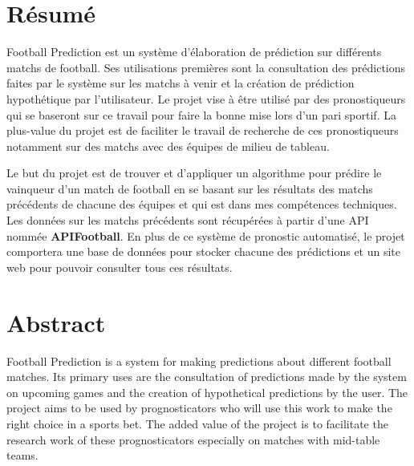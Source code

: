 \documentclass[a4paper,14pt]{extarticle}
\begin{document}
{\setlength{\parindent}{0cm} %
\setlength{\parskip}{1em} %

\newpage
\makeatletter

\begin{versionhistory}
\end{versionhistory}

\makeatother

\section{Résumé}

Football Prediction est un système d'élaboration de prédiction sur différents matchs de football. Ses utilisations premières sont la consultation des prédictions faites par le système sur les matchs à venir et la création de prédiction hypothétique par l'utilisateur. Le projet vise à être utilisé par des pronostiqueurs qui se baseront sur ce travail pour faire la bonne mise lors d'un pari sportif. La plus-value du projet est de faciliter le travail de recherche de ces pronostiqueurs notamment sur des matchs avec des équipes de milieu de tableau.

Le but du projet est de trouver et d'appliquer un algorithme pour prédire le vainqueur d'un match de football en se basant sur les résultats des matchs précédents de chacune des équipes et qui est dans mes compétences techniques. Les données sur les matchs précédents sont récupérées à partir d'une API nommée \textbf{APIFootball}. En plus de ce système de pronostic automatisé, le projet comportera une base de données pour stocker chacune des prédictions et un site web pour pouvoir consulter tous ces résultats.

\newpage

\section{Abstract}

Football Prediction is a system for making predictions about different football matches. Its primary uses are the consultation of predictions made by the system on upcoming games and the creation of hypothetical predictions by the user. The project aims to be used by prognosticators who will use this work to make the right choice in a sports bet. The added value of the project is to facilitate the research work of these prognosticators especially on matches with mid-table teams.

}
\end{document}
